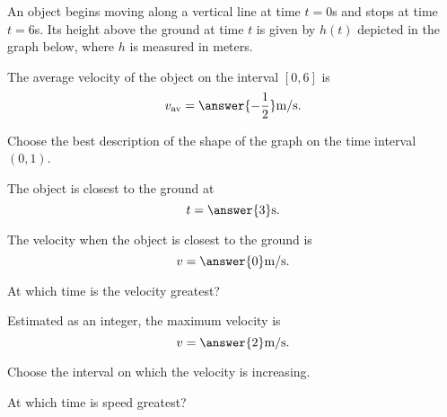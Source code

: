 \documentclass{ximera}
\author{Nela Lakos \and Kyle Parsons}
\begin{document}
\begin{exercise}

An object begins moving along a vertical line at time $t=0$s and stops at time $t=6$s.  Its height above the ground at time $t$ is given by $h(t)$ depicted in the graph below, where $h$ is measured in meters.

\begin{image}
\end{image}

The average velocity of the object on the interval $\left[0,6\right]$ is
\[
v_{\text{av}} = \answer{-\frac{1}{2}}\text{m/s}.
\]

Choose the best description of the shape of the graph on the time interval $\left(0,1\right)$.
\begin{multipleChoice}
\end{multipleChoice}

The object is closest to the ground at 
\[
t=\answer{3}\text{s}.
\]

The velocity when the object is closest to the ground is 
\[
v=\answer{0}\text{m/s}.
\]

At which time is the velocity greatest?
\begin{multipleChoice}
\end{multipleChoice}

Estimated as an integer, the maximum velocity is
\[
v=\answer{2}\text{m/s}.
\]

Choose the interval on which the velocity is increasing.
\begin{multipleChoice}
\end{multipleChoice}

At which time is speed greatest?
\begin{multipleChoice}
\end{multipleChoice}

\end{exercise}
\end{document}
